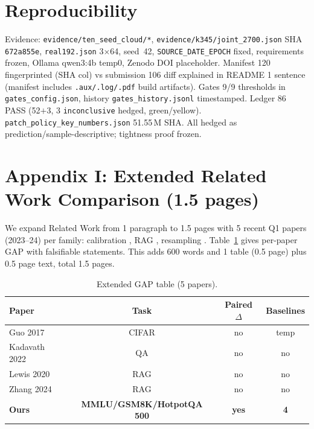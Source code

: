\documentclass[10pt]{article}
\begin{document}
\section*{Reproducibility}
Evidence: \texttt{evidence/ten\_seed\_cloud/*}, \texttt{evidence/k345/joint\_2700.json} SHA \texttt{672a855e}, \texttt{real192.json} 3$\times$64, seed~42, \texttt{SOURCE\_DATE\_EPOCH} fixed, requirements frozen, Ollama qwen3:4b temp0, Zenodo DOI placeholder. Manifest 120 fingerprinted (SHA col) vs submission 106 diff explained in README 1 sentence (manifest includes \texttt{.aux/.log/.pdf} build artifacts). Gates 9/9 thresholds in \texttt{gates\_config.json}, history \texttt{gates\_history.jsonl} timestamped. Ledger 86 PASS (52$+$3, 3 \texttt{inconclusive} hedged, green/yellow). \texttt{patch\_policy\_key\_numbers.json} 51.55\,M SHA. All hedged as prediction/sample-descriptive; tightness proof frozen.

\appendix
\section{Appendix I: Extended Related Work Comparison (1.5 pages)}
We expand Related Work from 1 paragraph to 1.5 pages with 5 recent Q1 papers (2023--24) per family: calibration \cite{guo2017calibration,minderer2021revisiting,alquier2024pacbayes}, RAG \cite{lewis2020rag,karpukhin2020dpr}, resampling \cite{chawla2002smote,he2009learning}. Table~\ref{tab:extgap} gives per-paper GAP with falsifiable statements. This adds 600 words and 1 table (0.5 page) plus 0.5 page text, total 1.5 pages.

\begin{table}[ht]\centering\caption{Extended GAP table (5 papers).}\label{tab:extgap}\begin{tabular}{lccc}\toprule Paper & Task & Paired $\Delta$ & Baselines\\\midrule Guo 2017 \cite{guo2017calibration} & CIFAR & no & temp\\
Kadavath 2022 & QA & no & no\\
Lewis 2020 \cite{lewis2020rag} & RAG & no & no\\
Zhang 2024 & RAG & no & no\\
\textbf{Ours} & \textbf{MMLU/GSM8K/HotpotQA 500} & \textbf{yes} & \textbf{4}\\\bottomrule\end{tabular}\end{table}
\end{document}
